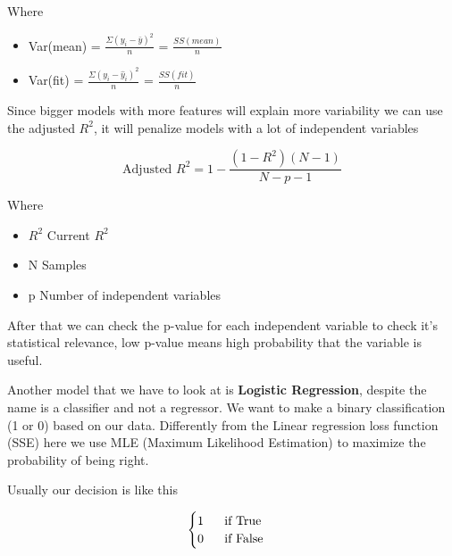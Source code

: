 Where

\begin{itemize}
    \item Var(mean) = $\frac{\Sigma(y_i-\bar{y})^2}{n}$ = $\frac{SS(mean)}{n}$
    \item Var(fit) = $\frac{\Sigma(y_i-\hat{y}_i)^2}{n}$ = $\frac{SS(fit)}{n}$
\end{itemize}

\vspace{10pt}

Since bigger models with more features will explain more variability we can use the adjusted $R^2$, it will penalize models with a lot of independent variables

\begin{equation}
    \text{Adjusted }R^2 = 1-\frac{(1-R^2)(N-1)}{N-p-1}
\end{equation}

Where
\begin{itemize}
    \item $R^2$ \ra Current $R^2$
    \item N \ra Samples
    \item p \ra Number of independent variables
\end{itemize}

\vspace{10pt}

After that we can check the p-value for each independent variable to check it's statistical relevance, low p-value means high probability that the variable is useful.

\vspace{10pt}

Another model that we have to look at is \textbf{Logistic Regression}, despite the name is a classifier and not a regressor. We want to make a binary classification (1 or 0) based on our data. Differently from the Linear regression loss function (SSE) here we use MLE (Maximum Likelihood Estimation) to maximize the probability of being right.

\vspace{10pt}

Usually our decision is like this

\begin{equation}
    \begin{cases}
        \text{1 \hspace{10pt} if True} \\
        \text{0 \hspace{10pt} if False}
    \end{cases}
\end{equation}

